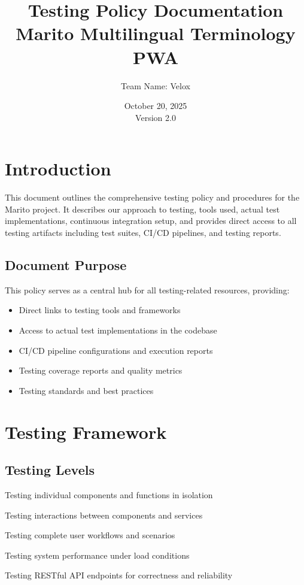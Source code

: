 \documentclass[12pt,a4paper]{article}
\title{\textbf{Testing Policy Documentation} \\ Marito Multilingual Terminology PWA}
\author{Team Name: Velox}
\date{October 20, 2025 \\ Version 2.0}
\begin{document}
\maketitle
\thispagestyle{empty}
\newpage

\tableofcontents
\newpage

\section{Introduction}
This document outlines the comprehensive testing policy and procedures for the Marito project. It describes our approach to testing, tools used, actual test implementations, continuous integration setup, and provides direct access to all testing artifacts including test suites, CI/CD pipelines, and testing reports.

\subsection{Document Purpose}
This policy serves as a central hub for all testing-related resources, providing:
\begin{itemize}
    \item Direct links to testing tools and frameworks
    \item Access to actual test implementations in the codebase
    \item CI/CD pipeline configurations and execution reports
    \item Testing coverage reports and quality metrics
    \item Testing standards and best practices
\end{itemize}

\section{Testing Framework}

\subsection{Testing Levels}
\begin{description}[style=nextline]
    \item[Unit Testing] Testing individual components and functions in isolation
    \item[Integration Testing] Testing interactions between components and services
    \item[End-to-End Testing] Testing complete user workflows and scenarios
    \item[Performance Testing] Testing system performance under load conditions
    \item[API Testing] Testing RESTful API endpoints for correctness and reliability
\end{description}
\end{document}
